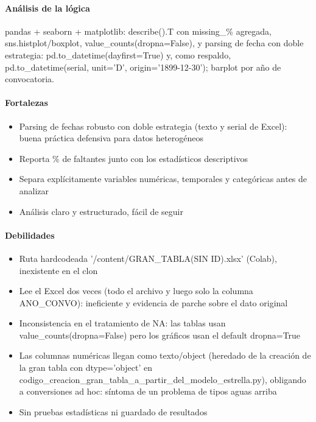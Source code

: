 \paragraph{Análisis de la lógica}
pandas + seaborn + matplotlib: describe().T con missing\_\% agregada, sns.histplot/boxplot, value\_counts(dropna=False), y parsing de fecha con doble estrategia: pd.to\_datetime(dayfirst=True) y, como respaldo, pd.to\_datetime(serial, unit='D', origin='1899-12-30'); barplot por año de convocatoria.

\paragraph{Fortalezas}
\begin{itemize}
  \item Parsing de fechas robusto con doble estrategia (texto y serial de Excel): buena práctica defensiva para datos heterogéneos
  \item Reporta \% de faltantes junto con los estadísticos descriptivos
  \item Separa explícitamente variables numéricas, temporales y categóricas antes de analizar
  \item Análisis claro y estructurado, fácil de seguir
\end{itemize}

\paragraph{Debilidades}
\begin{itemize}
  \item Ruta hardcodeada '/content/GRAN\_TABLA(SIN ID).xlsx' (Colab), inexistente en el clon
  \item Lee el Excel dos veces (todo el archivo y luego solo la columna ANO\_CONVO): ineficiente y evidencia de parche sobre el dato original
  \item Inconsistencia en el tratamiento de NA: las tablas usan value\_counts(dropna=False) pero los gráficos usan el default dropna=True
  \item Las columnas numéricas llegan como texto/object (heredado de la creación de la gran tabla con dtype='object' en codigo\_creacion\_gran\_tabla\_a\_partir\_del\_modelo\_estrella.py), obligando a conversiones ad hoc: síntoma de un problema de tipos aguas arriba
  \item Sin pruebas estadísticas ni guardado de resultados
\end{itemize}


